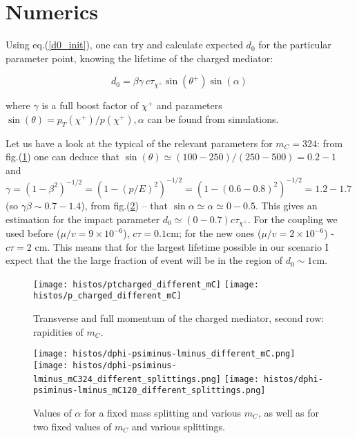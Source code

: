 \documentclass[12pt,letterpaper,notitlepage]{article}
\begin{document}
\section{Numerics}

Using eq.(\ref{d0_init}), one can try and calculate expected $d_0$ for the particular parameter point, knowing the lifetime of the charged mediator:

\begin{equation} \label{d0_lifetime}
  d_0= \beta \gamma\ c \tau_{\chi^+} \sin(\theta^+) \sin (\alpha)
\end{equation}

where $\gamma$ is a full boost factor of $\chi^+$ and parameters $\sin(\theta)=p_T(\chi^+)/p(\chi^+), \alpha$ can be found from simulations.

Let us have a look at the typical of the relevant parameters for $m_C=324$: from fig.(\ref{fig:charged-kin}) one can deduce that $\sin(\theta) \simeq (100-250)/(250-500)=0.2-1$ and $\gamma=(1-\beta^2)^{-1/2}=(1-(p/E)^2)^{-1/2}=(1-(0.6-0.8)^2)^{-1/2}=1.2-1.7$ (so $\gamma \beta \sim 0.7-1.4$), from fig.(\ref{fig:alpha}) -- that $\sin \alpha \simeq \alpha \simeq 0-0.5$. This gives an estimation for the impact parameter $d_0 \simeq (0-0.7)c \tau_{\chi^+}$. For the coupling we used before ($\mu/v=9 \times 10^{-6}$), $c \tau = 0.1 \text{cm}$; for the new ones ($\mu/v=2 \times 10^{-6}$) - $c \tau = 2 \text{ cm}$. This means that for the largest lifetime possible in our scenario I expect that the the large fraction of event will be in the region of $d_0 \sim 1 \text{cm}$.

\begin{figure}[h!]
\centering
\texttt{[image: histos/ptcharged\_different\_mC]}
\texttt{[image: histos/p\_charged\_different\_mC]}


\caption{\label{fig:charged-kin}Transverse and full momentum of the charged mediator, second row: rapidities of $m_C$.}
\end{figure}


\begin{figure}[h!]
\centering
\texttt{[image: histos/dphi-psiminus-lminus\_different\_mC.png]}\\
\texttt{[image: histos/dphi-psiminus-lminus\_mC324\_different\_splittings.png]}
\texttt{[image: histos/dphi-psiminus-lminus\_mC120\_different\_splittings.png]}

\caption{\label{fig:alpha}Values of $\alpha$ for a fixed mass splitting and various $m_C$, as well as for two fixed values of $m_C$ and various splittings.}
\end{figure}
\end{document}
